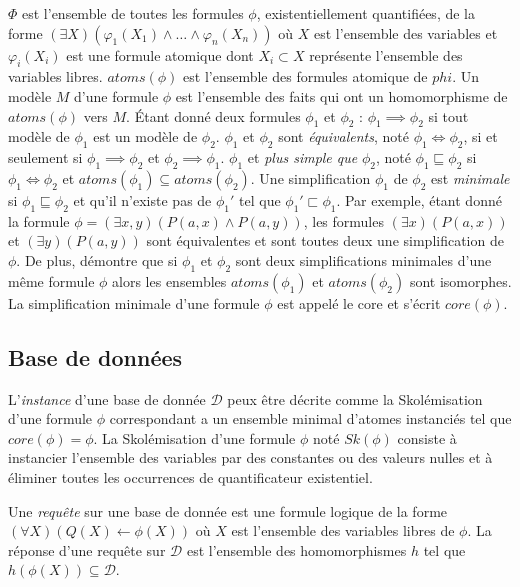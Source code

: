 $\Phi$ est l'ensemble de toutes les formules $\phi$, existentiellement quantifiées, de la forme $(\exists X)(\varphi_1(X_1) \land \dots \land \varphi_n(X_n))$ où $X$ est l'ensemble des variables et $\varphi_i(X_i)$ est une formule atomique dont $X_i \subset X$ représente l'ensemble des variables libres.
$atoms(\phi)$ est l'ensemble des formules atomique de $phi$.
Un modèle $M$ d'une formule $\phi$ est l'ensemble des faits qui ont un homomorphisme de $atoms(\phi)$ vers $M$.
Étant donné deux formules $\phi_1$ et $\phi_2$ : $\phi_1 \implies \phi_2$ si tout modèle de $\phi_1$ est un modèle de $\phi_2$.
$\phi_1$ et $\phi_2$ sont \textit{équivalents}, noté $\phi_1 \iff \phi_2$, si et seulement si $\phi_1 \implies \phi_2$ et $\phi_2 \implies \phi_1$.
$\phi_1$ et \textit{plus simple que} $\phi_2$, noté $\phi_1 \sqsubseteq \phi_2$ si $\phi_1 \iff \phi_2$ et $atoms(\phi_1) \subseteq atoms(\phi_2)$.
Une simplification $\phi_1$ de $\phi_2$ est \textit{minimale} si $\phi_1 \sqsubseteq \phi_2$ et qu'il n'existe pas de $\phi_1'$ tel que $\phi_1' \sqsubset \phi_1$.
Par exemple, étant donné la formule $\phi = (\exists x, y)(P(a, x) \land P(a, y))$, les formules $(\exists x)(P(a, x))$ et $(\exists y)(P(a, y))$ sont équivalentes et sont toutes deux une simplification de $\phi$.
De plus, \cite{chabinConsistentUpdatingDatabases2020} démontre que si $\phi_1$ et $\phi_2$ sont deux simplifications minimales d'une même formule $\phi$ alors les ensembles $atoms(\phi_1)$ et $atoms(\phi_2)$ sont isomorphes.
La simplification minimale d'une formule $\phi$ est appelé le core et s'écrit $core(\phi)$.

\subsection{Base de données}
\label{sec:update:pre:db}

L'\textit{instance} d'une base de donnée $\mathcal{D}$ peux être décrite comme la Skolémisation d'une formule $\phi$ correspondant a un ensemble minimal d'atomes instanciés tel que $core(\phi) = \phi$.
La Skolémisation d'une formule $\phi$ noté $Sk(\phi)$ consiste à instancier l'ensemble des variables par des constantes ou des valeurs nulles et à éliminer toutes les occurrences de quantificateur existentiel.

Une \textit{requête} sur une base de donnée est une formule logique de la forme $(\forall X)(Q(X) \gets \phi(X))$ où $X$ est l'ensemble des variables libres de $\phi$.
La réponse d'une requête sur $\mathcal{D}$ est l'ensemble des homomorphismes $h$ tel que $h(\phi(X)) \subseteq \mathcal{D}$.

